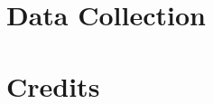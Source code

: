 \documentclass[a4paper]{article}
\begin{document}
\appendix
\section{Data Collection}



\newpage

\section{Credits}

\newpage








\end{document}
